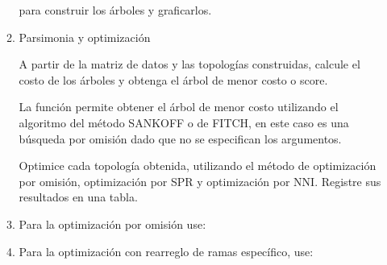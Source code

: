 \begin{itemize}
\begin{enumerate}
para construir los \'arboles y graficarlos.


\item{Parsimonia y optimizaci\'on}
 
A partir de la matriz de datos  y las topolog\'ias construidas,  calcule el costo  de los \'arboles y obtenga el \'arbol de menor costo o score.

La funci\'on  permite obtener el \'arbol de menor costo utilizando el algoritmo del m\'etodo SANKOFF o de FITCH,  en este caso es una b\'usqueda por omisi\'on dado que no se especifican los argumentos.
 

Optimice cada topolog\'ia obtenida, utilizando el m\'etodo de optimizaci\'on por omisi\'on,  optimizaci\'on por SPR y optimizaci\'on por NNI. Registre sus resultados en una tabla.

\item Para la optimizaci\'on por omisi\'on use:


\item Para la optimizaci\'on con rearreglo de ramas espec\'ifico, use:



\end{enumerate}
\end{itemize}
